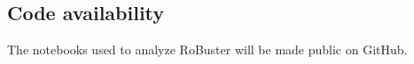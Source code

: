 \documentclass[sn-mathphys,Numbered]{sn-jnl}%
\theoremstyle{thmstyleone}%
\theoremstyle{thmstyletwo}%
\theoremstyle{thmstylethree}%
\begin{document}
\subsection*{Code availability}
%
The notebooks used to analyze RoBuster will be made public on GitHub.
%
%
%
%
%
%
%
%
%
%
%
%
%
%
%


\end{document}
